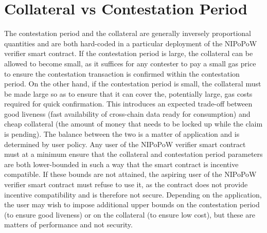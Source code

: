 \section{Collateral vs Contestation Period} The contestation
period and the collateral are generally inversely proportional quantities and
are both hard-coded in a particular deployment of the NIPoPoW verifier smart
contract.  If the contestation period is large, the collateral can be allowed
to become small, as it suffices for any contester to pay a small gas price to
ensure the contestation transaction is confirmed within the contestation
period. On the other hand, if the contestation period is small, the collateral
must be made large so as to ensure that it can cover the, potentially large,
gas costs required for quick confirmation. This introduces an expected
trade-off between good liveness (fast availability of cross-chain data ready
for consumption) and cheap collateral (the amount of money that needs to be
locked up while the claim is pending).  The balance between the two is a matter
of application and is determined by user policy.  Any user of the NIPoPoW
verifier smart contract must at a minimum ensure that the collateral and
contestation period parameters are both lower-bounded in such a way that the
smart contract is incentive compatible.  If these bounds are not attained, the
aspiring user of the NIPoPoW verifier smart contract must refuse to use it, as
the contract does not provide incentive compatibility and is therefore not
secure. Depending on the application, the user may wish to impose additional
upper bounds on the contestation period (to ensure good liveness) or on the
collateral (to ensure low cost), but these are matters of performance and not
security.

